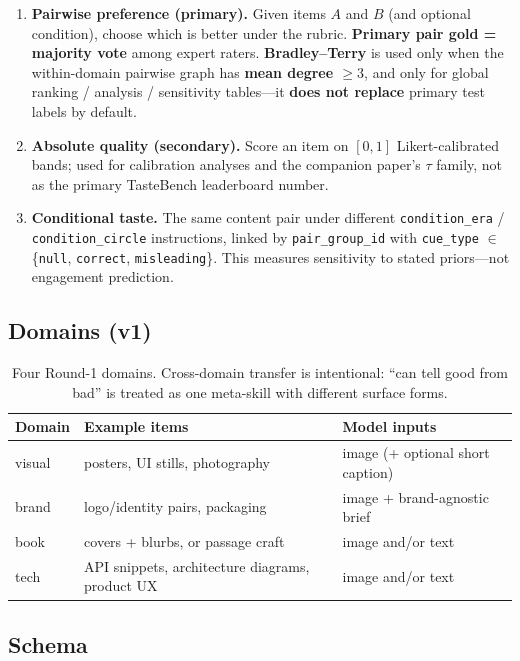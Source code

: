 \documentclass[11pt,a4paper]{article}
\begin{document}
\begin{enumerate}[leftmargin=*,itemsep=2pt]
  \item \textbf{Pairwise preference (primary).} Given items $A$ and $B$ (and optional condition), choose which is better under the rubric. \textbf{Primary pair gold = majority vote} among expert raters. \textbf{Bradley--Terry} is used only when the within-domain pairwise graph has \textbf{mean degree $\ge 3$}, and only for global ranking / analysis / sensitivity tables---it \textbf{does not replace} primary test labels by default.
  \item \textbf{Absolute quality (secondary).} Score an item on $[0,1]$ Likert-calibrated bands; used for calibration analyses and the companion paper's $\tau$ family, not as the primary TasteBench leaderboard number.
  \item \textbf{Conditional taste.} The same content pair under different \texttt{condition\_era} / \texttt{condition\_circle} instructions, linked by \texttt{pair\_group\_id} with \texttt{cue\_type} $\in$ \{\texttt{null}, \texttt{correct}, \texttt{misleading}\}. This measures sensitivity to stated priors---not engagement prediction.
\end{enumerate}

\subsection{Domains (v1)}

\begin{table}[t]
\centering
\small
\begin{tabular}{@{}lll@{}}
\toprule
Domain & Example items & Model inputs \\
\midrule
visual & posters, UI stills, photography & image (+ optional short caption) \\
brand  & logo/identity pairs, packaging & image + brand-agnostic brief \\
book   & covers + blurbs, or passage craft & image and/or text \\
tech   & API snippets, architecture diagrams, product UX & image and/or text \\
\bottomrule
\end{tabular}
\caption{Four Round-1 domains. Cross-domain transfer is intentional: ``can tell good from bad'' is treated as one meta-skill with different surface forms.}
\label{tab:domains}
\end{table}

\subsection{Schema}
\end{document}
